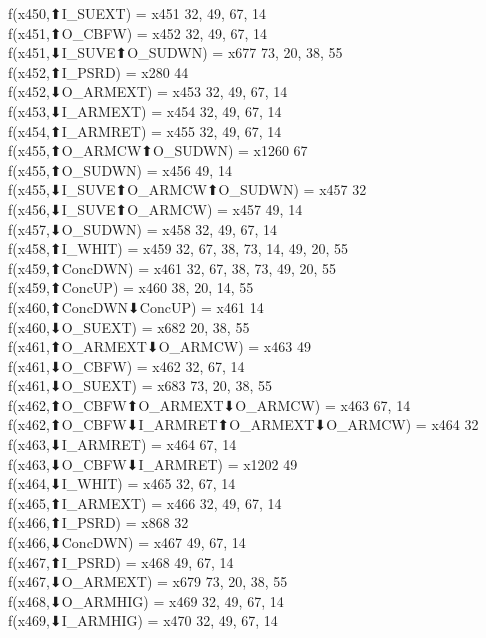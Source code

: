 f(x450,⬆I_SUEXT) = x451 {32, 49, 67, 14} \\
f(x451,⬆O_CBFW) = x452 {32, 49, 67, 14} \\
f(x451,⬇I_SUVE⬆O_SUDWN) = x677 {73, 20, 38, 55} \\
f(x452,⬆I_PSRD) = x280 {44} \\
f(x452,⬇O_ARMEXT) = x453 {32, 49, 67, 14} \\
f(x453,⬇I_ARMEXT) = x454 {32, 49, 67, 14} \\
f(x454,⬆I_ARMRET) = x455 {32, 49, 67, 14} \\
f(x455,⬆O_ARMCW⬆O_SUDWN) = x1260 {67} \\
f(x455,⬆O_SUDWN) = x456 {49, 14} \\
f(x455,⬇I_SUVE⬆O_ARMCW⬆O_SUDWN) = x457 {32} \\
f(x456,⬇I_SUVE⬆O_ARMCW) = x457 {49, 14} \\
f(x457,⬇O_SUDWN) = x458 {32, 49, 67, 14} \\
f(x458,⬆I_WHIT) = x459 {32, 67, 38, 73, 14, 49, 20, 55} \\
f(x459,⬆ConcDWN) = x461 {32, 67, 38, 73, 49, 20, 55} \\
f(x459,⬆ConcUP) = x460 {38, 20, 14, 55} \\
f(x460,⬆ConcDWN⬇ConcUP) = x461 {14} \\
f(x460,⬇O_SUEXT) = x682 {20, 38, 55} \\
f(x461,⬆O_ARMEXT⬇O_ARMCW) = x463 {49} \\
f(x461,⬇O_CBFW) = x462 {32, 67, 14} \\
f(x461,⬇O_SUEXT) = x683 {73, 20, 38, 55} \\
f(x462,⬆O_CBFW⬆O_ARMEXT⬇O_ARMCW) = x463 {67, 14} \\
f(x462,⬆O_CBFW⬇I_ARMRET⬆O_ARMEXT⬇O_ARMCW) = x464 {32} \\
f(x463,⬇I_ARMRET) = x464 {67, 14} \\
f(x463,⬇O_CBFW⬇I_ARMRET) = x1202 {49} \\
f(x464,⬇I_WHIT) = x465 {32, 67, 14} \\
f(x465,⬆I_ARMEXT) = x466 {32, 49, 67, 14} \\
f(x466,⬆I_PSRD) = x868 {32} \\
f(x466,⬇ConcDWN) = x467 {49, 67, 14} \\
f(x467,⬆I_PSRD) = x468 {49, 67, 14} \\
f(x467,⬇O_ARMEXT) = x679 {73, 20, 38, 55} \\
f(x468,⬇O_ARMHIG) = x469 {32, 49, 67, 14} \\
f(x469,⬇I_ARMHIG) = x470 {32, 49, 67, 14} \\
